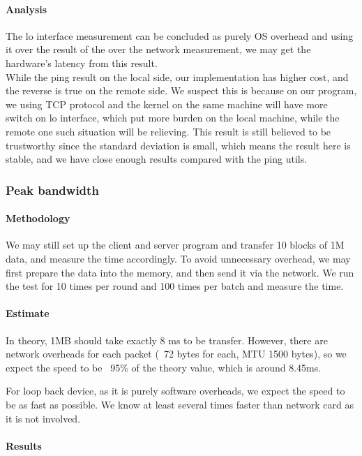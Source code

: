 \paragraph{Analysis}

The lo interface measurement can be concluded as purely OS overhead and using it over the result of the over the network measurement, we may get the hardware's latency from this result. \\
While the ping result on the local side, our implementation has higher cost, and the reverse is true on the remote side. We suspect this is because on our program, we using TCP protocol and the kernel on the same machine will have more switch on lo interface, which put more burden on the local machine, while the remote one such situation will be relieving. This result is still believed to be trustworthy since the standard deviation is small, which means the result here is stable, and we have close enough results compared with the ping utils.

\subsubsection{Peak bandwidth}

\paragraph{Methodology}

We may still set up the client and server program and transfer 10 blocks of 1M data, and measure the time accordingly. To avoid unnecessary overhead, we may first prepare the data into the memory, and then send it via the network. We run the test for 10 times per round and 100 times per batch and measure the time. 

\paragraph{Estimate}

In theory, 1MB should take exactly 8 ms to be transfer. However, there are network overheads for each packet (~72 bytes for each, MTU 1500 bytes), so we expect the speed to be ~95\% of the theory value, which is around 8.45ms.

For loop back device, as it is purely software overheads, we expect the speed to be as fast as possible. We know at least several times faster than network card as it is not involved.

\paragraph{Results}

